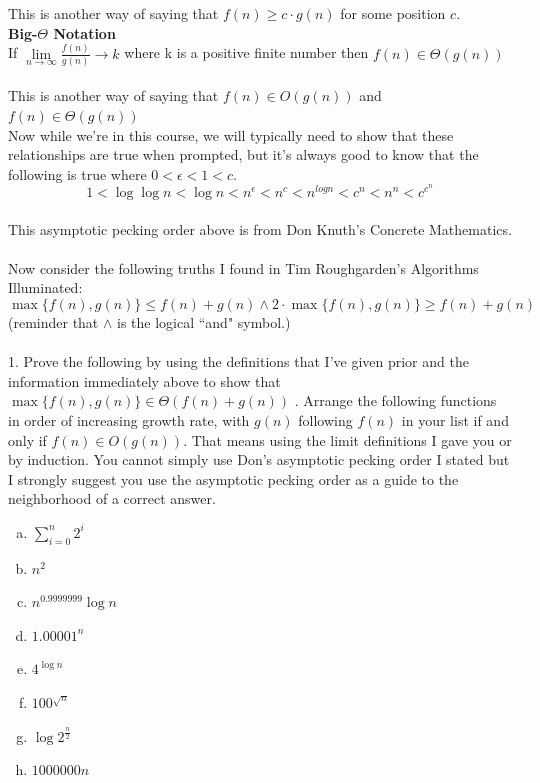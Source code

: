 \documentclass[12pt]{article}
\begin{document}
This is another way of saying that $f(n) \geq c \cdot g(n)$ for some position $c$.\\
\textbf{Big-$\Theta$ Notation}\\
If $\lim\limits_{n\to\infty}{\frac{f(n)}{g(n)}}\to k$ where k is a positive finite number then $f(n) \in \Theta(g(n))$\\\\
This is another way of saying that $f(n) \in O(g(n))$ and $f(n) \in \Theta(g(n))$\.\\
Now while we're in this course, we will typically need to show that these relationships are true when prompted, but it's always good to know that the following is true where \begin{math}0 < \epsilon < 1 < c\end{math}.\\
\[1 < \log{\log{n}} < \log{n} < n^{\epsilon} < n^c < n^{log{n}} < c^n < n^n < c^{c^{n}}\]\\
This asymptotic pecking order above is from Don Knuth's Concrete Mathematics.\\\\
\newpage
Now consider the following truths I found in Tim Roughgarden's Algorithms Illuminated: \\
$$\max\{f(n),g(n)\} \leq f(n) + g(n) \land  2 \cdot \max\{f(n),g(n)\} \geq f(n) + g(n)$$
(reminder that $\land$ is the logical ``and" symbol.)\\\\
1. Prove the following  by using the definitions that I've given prior and the information immediately above to show that $\max\{f(n),g(n)\}\in\Theta(f(n) + g(n))$
\newpage
{}. Arrange the following functions in order of increasing growth rate, with $g(n)$ following $f(n)$ in your list if and only if $f(n) \in O(g(n))$. That means using the limit definitions I gave you or by induction. You cannot simply use Don's asymptotic pecking order I stated but I strongly suggest you use the asymptotic pecking order as a guide to the neighborhood of a correct answer.\\
\begin{enumerate}[a)]
\item $\sum\limits_{i = 0}^{n} 2^i$\\
\item $n^2$\\
\item $n^{0.9999999}\log{n}$\\
\item $1.00001^n$\\
\item $4^{\log{n}}$\\
\item $100^{\sqrt{n}}$\\
\item $\log{2^{\frac{n}{2}}}$\\
\item $1000000n$\\
\end{enumerate}
\end{document}
